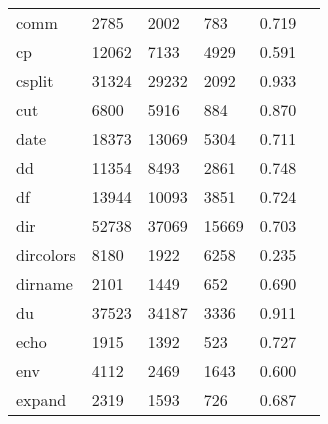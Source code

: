 \begin{longtable}{lp{2.4cm}p{2.4cm}p{2.4cm}p{2.4cm}p{2.4cm}}
comm      &                                    2785 &                        2002 &                          783 &                                   0.719 \\
cp        &                                   12062 &                        7133 &                         4929 &                                   0.591 \\
csplit    &                                   31324 &                       29232 &                         2092 &                                   0.933 \\
cut       &                                    6800 &                        5916 &                          884 &                                   0.870 \\
date      &                                   18373 &                       13069 &                         5304 &                                   0.711 \\
dd        &                                   11354 &                        8493 &                         2861 &                                   0.748 \\
df        &                                   13944 &                       10093 &                         3851 &                                   0.724 \\
dir       &                                   52738 &                       37069 &                        15669 &                                   0.703 \\
dircolors &                                    8180 &                        1922 &                         6258 &                                   0.235 \\
dirname   &                                    2101 &                        1449 &                          652 &                                   0.690 \\
du        &                                   37523 &                       34187 &                         3336 &                                   0.911 \\
echo      &                                    1915 &                        1392 &                          523 &                                   0.727 \\
env       &                                    4112 &                        2469 &                         1643 &                                   0.600 \\
expand    &                                    2319 &                        1593 &                          726 &                                   0.687 \\

\end{longtable}
